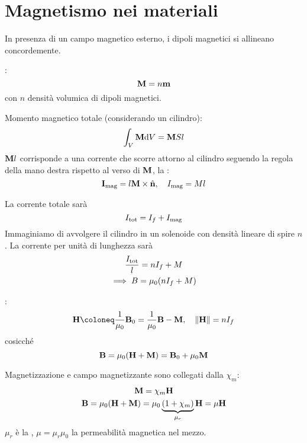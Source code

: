 \section{Magnetismo nei materiali}

In presenza di un campo magnetico esterno, i dipoli magnetici si allineano concordemente.

:
\begin{equation}
    \mathbf{M} = n\mathbf{m}
\end{equation}
con $n$ densità volumica di dipoli magnetici.

Momento magnetico totale (considerando un cilindro):
\begin{equation}
    \int_V \mathbf{M} \mathrm{d} V = \mathbf{M} S l
\end{equation}
$\mathbf{M} l$ corrisponde a una corrente che scorre attorno al cilindro seguendo la regola della mano destra rispetto al verso di $\mathbf{M}$, la :
\begin{equation}
    \mathbf{I}_\text{mag} = l\mathbf{M} \times \hat{\mathbf{n}}, \quad
    I_\text{mag} = M l
\end{equation}

La corrente totale sarà
\begin{equation}
    I_\text{tot} = I_f + I_\text{mag}
\end{equation}
Immaginiamo di avvolgere il cilindro in un solenoide con densità lineare di spire $n$.
La corrente per unità di lunghezza sarà
\begin{gather}
    \frac{I_\text{tot}}{l} = n I_f + M \\
    \implies B = \mu_0(nI_f + M)
\end{gather}

:
\begin{equation}
    \H \coloneq \frac{1}{\mu_0} \B_0 = \frac{1}{\mu_0} \B - \vt{M}, \quad \norm{\H} = n I\free
\end{equation}
cosicché
\begin{equation}
    \mathbf{B} = \mu_0 (\mathbf{H} + \mathbf{M}) = \mathbf{B}_0 + \mu_0\mathbf{M}
\end{equation}

Magnetizzazione e campo magnetizzante sono collegati dalla  $\chi_m$:
\begin{gather}
    \mathbf{M} = \chi_m \mathbf{H} \\
    \mathbf{B} = \mu_0 (\mathbf{H} + \mathbf{M}) = \mu_0 \underbrace{(1 + \chi_m)}_{\mu_r} \mathbf{H} = \mu \mathbf{H}
\end{gather}
$\mu_r$ è la , $\mu = \mu_r \mu_0$ la permeabilità magnetica nel mezzo.

